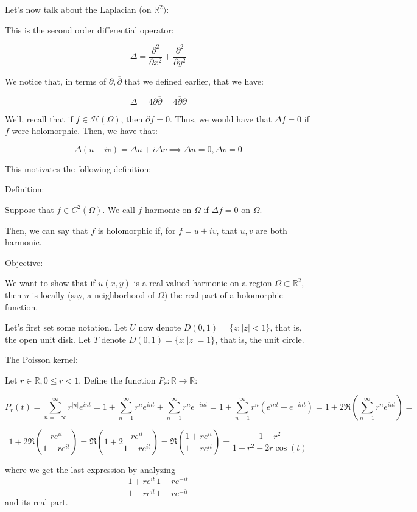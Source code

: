 \documentclass[10pt]{article}
\newcommand{\calH}{\mathcal{H}}
\begin{document}
Let’s now talk about the Laplacian (on $\mathbb{R}^2)$:

This is the second order differential operator:

$$\Delta = \frac{\partial^2}{\partial x^2} +  \frac{\partial^2}{\partial y^2}$$

We notice that, in terms of $\partial, \overline{\partial}$ that we defined earlier, that we have:

$$ \Delta = 4 \partial \overline{\partial} = 4 \overline{\partial} \partial $$

Well, recall that if $f \in \calH(\Omega)$, then $\overline{\partial} f = 0$. Thus, we would have that $\Delta f = 0$ if $f$ were holomorphic. Then, we have that:

$$ \Delta (u + i v) = \Delta u + i \Delta v \implies \Delta u = 0, \Delta v = 0$$

This motivates the following definition:

Definition:

Suppose that $f \in C^2(\Omega)$. We call $f$ harmonic on $\Omega$ if $\Delta f = 0$ on $\Omega$.

Then, we can say that $f$ is holomorphic if, for $f = u + iv$, that $u,v$ are both harmonic. 

Objective:

We want to show that if $u(x,y)$ is a real-valued harmonic on a region $\Omega \subset \mathbb{R}^2$, then $u$ is locally (say, a neighborhood of $\Omega$) the real part of a holomorphic function.

Let’s first set some notation. Let $U$ now denote $D(0,1) = \{ z : |z| < 1 \}$, that is, the open unit disk. Let $T$ denote $\overline{D}(0,1) = \{ z : |z| = 1 \}$, that is, the unit circle. 

The Poisson kernel:

Let $ r \in \mathbb{R}, 0 \leq r < 1$. Define the function $P_r: \mathbb{R} \to \mathbb{R}$:

$$P_r(t) = \sum_{n = -\infty}^\infty r^{|n|} e^{i n t} = 1 + \sum_{n=1}^\infty r^n e^{i n t} + \sum_{n=1}^{\infty} r^{n} e^{-int} = 1 + \sum_{n=1}^\infty r^n(e^{int} + e^{-int}) = 1 + 2\Re \left( \sum_{n=1}^\infty r^n e^{int} \right) =$$

$$ 1 + 2\Re \left( \frac{r e^{it}}{1 - r e^{it}} \right) = \Re \left( 1 + 2 \frac{r e^{it}}{1 - r e^{it}} \right) = \Re \left(  \frac{1 + re^{it}}{1 - re^{it}} \right) = \frac{1 - r^2}{1 + r^2 - 2r\cos(t)}$$

where we get the last expression by analyzing $$ \frac{1 + re^{it}}{1 - re^{it}} \frac{1 - re^{-it}}{1 - re^{-it}}$$ and its real part.
\end{document}
